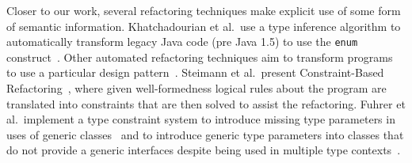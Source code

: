 \documentclass[sigconf]{acmart}
\begin{document}
Closer to our work, several refactoring techniques make explicit use of some
form of semantic information.
%
%
Khatchadourian et al.~use a type inference algorithm to automatically
transform legacy Java code (pre Java 1.5) to use the \lstinline[breaklines=true]{enum}
construct~\cite{sawin}.
%
%
Other automated refactoring techniques aim to transform programs to use a
particular design pattern~\cite{chris,bae}.
%
%
%
%
%
Steimann et al.~present Constraint-Based
Refactoring~\cite{Steimann2011,Steimann2012Pilgrim,Steimann2011KollePilgrim},
where given well-formedness logical rules about the program are translated
into constraints that are then solved to assist the refactoring.
%
%
Fuhrer et al.~implement a type constraint system to introduce missing type
parameters in uses of generic classes~\cite{DBLP:conf/ecoop/FuhrerTKDK05}
and to introduce generic type parameters into classes that do not provide a
generic interfaces despite being used in multiple type
contexts~\cite{DBLP:conf/icse/KiezunETF07}.
%
%
\end{document}
